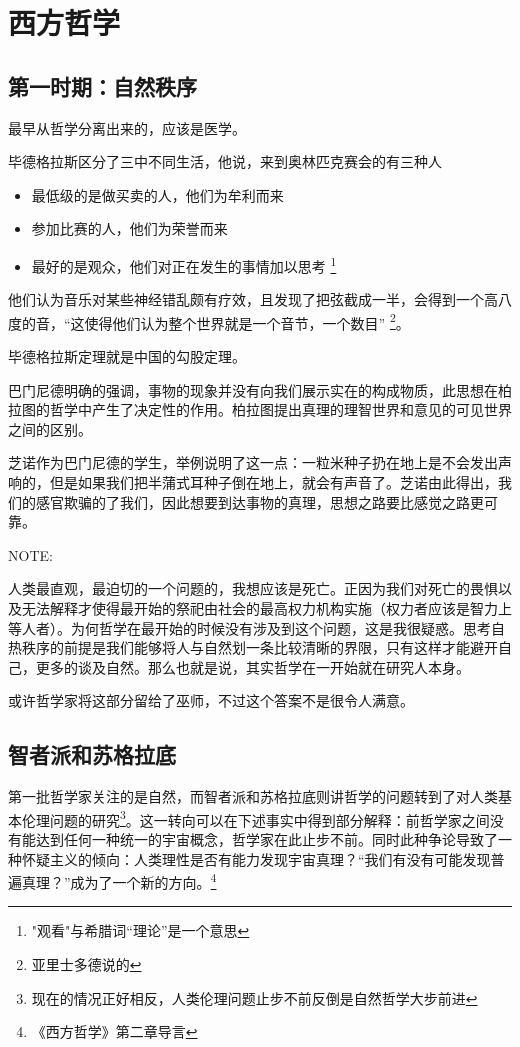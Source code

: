 \chapter{西方哲学}

\section{第一时期：自然秩序}

最早从哲学分离出来的，应该是医学。

毕德格拉斯区分了三中不同生活，他说，来到奥林匹克赛会的有三种人
\begin{itemize}
\item 最低级的是做买卖的人，他们为牟利而来
\item 参加比赛的人，他们为荣誉而来
\item  最好的是观众，他们对正在发生的事情加以思考 \footnote{"观看"与希腊词“理论”是一个意思}
\end{itemize}

他们认为音乐对某些神经错乱颇有疗效，且发现了把弦截成一半，会得到一个高八度的音，“这使得他们认为整个世界就是一个音节，一个数目” \footnote{亚里士多德说的}。

毕德格拉斯定理就是中国的勾股定理。

巴门尼德明确的强调，事物的现象并没有向我们展示实在的构成物质，此思想在柏拉图的哲学中产生了决定性的作用。柏拉图提出真理的理智世界和意见的可见世界之间的区别。

芝诺作为巴门尼德的学生，举例说明了这一点：一粒米种子扔在地上是不会发出声响的，但是如果我们把半蒲式耳种子倒在地上，就会有声音了。芝诺由此得出，我们的感官欺骗的了我们，因此想要到达事物的真理，思想之路要比感觉之路更可靠。

NOTE:


人类最直观，最迫切的一个问题的，我想应该是死亡。正因为我们对死亡的畏惧以及无法解释才使得最开始的祭祀由社会的最高权力机构实施（权力者应该是智力上等人者）。为何哲学在最开始的时候没有涉及到这个问题，这是我很疑惑。思考自热秩序的前提是我们能够将人与自然划一条比较清晰的界限，只有这样才能避开自己，更多的谈及自然。那么也就是说，其实哲学在一开始就在研究人本身。

或许哲学家将这部分留给了巫师，不过这个答案不是很令人满意。


\section{智者派和苏格拉底}

第一批哲学家关注的是自然，而智者派和苏格拉底则讲哲学的问题转到了对人类基本伦理问题的研究\footnote{现在的情况正好相反，人类伦理问题止步不前反倒是自然哲学大步前进}。这一转向可以在下述事实中得到部分解释：前哲学家之间没有能达到任何一种统一的宇宙概念，哲学家在此止步不前。同时此种争论导致了一种怀疑主义的倾向：人类理性是否有能力发现宇宙真理？“我们有没有可能发现普遍真理？”成为了一个新的方向。\footnote{《西方哲学》第二章导言}

